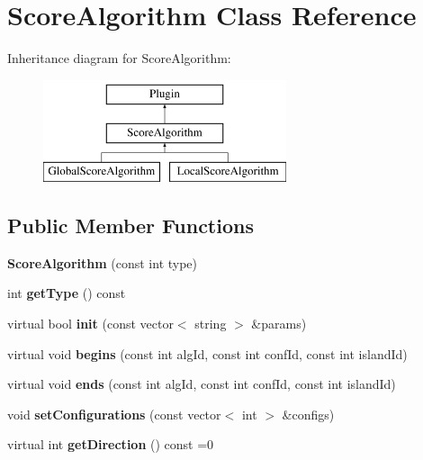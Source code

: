 \hypertarget{classScoreAlgorithm}{}\section{Score\+Algorithm Class Reference}
\label{classScoreAlgorithm}
Inheritance diagram for Score\+Algorithm\+:\begin{figure}[H]
\begin{center}
\leavevmode
\includegraphics[height=3.000000cm]{da/de1/classScoreAlgorithm}
\end{center}
\end{figure}
\subsection*{Public Member Functions}
\begin{DoxyCompactItemize}
\item 
\mbox{\label{classScoreAlgorithm_aca316a7c8fb4a7d65793142ffb0854c0}} 
{\bfseries Score\+Algorithm} (const int type)
\item 
\mbox{\label{classScoreAlgorithm_aa5a21e0bd7246db2f4bf4994f63badbe}} 
int {\bfseries get\+Type} () const
\item 
\mbox{\label{classScoreAlgorithm_ac8cc1949e42bc5e7f9b40a2fd5431fce}} 
virtual bool {\bfseries init} (const vector$<$ string $>$ \&params)
\item 
\mbox{\label{classScoreAlgorithm_adebfd2133cc2531c4573eb4447285dcc}} 
virtual void {\bfseries begins} (const int alg\+Id, const int conf\+Id, const int island\+Id)
\item 
\mbox{\label{classScoreAlgorithm_a68a608ca6d436baa5ac73b39b29215dc}} 
virtual void {\bfseries ends} (const int alg\+Id, const int conf\+Id, const int island\+Id)
\item 
\mbox{\label{classScoreAlgorithm_a0366ab9698f481f382d676d77feebf7b}} 
void {\bfseries set\+Configurations} (const vector$<$ int $>$ \&configs)
\item 
\mbox{\label{classScoreAlgorithm_a88bb035f0b88fa201add6766fec426b5}} 
virtual int {\bfseries get\+Direction} () const =0
\end{DoxyCompactItemize}
